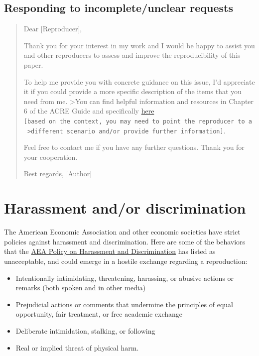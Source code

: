 \documentclass[]{book}
\providecommand{\tightlist}{%
  \setlength{\itemsep}{0pt}\setlength{\parskip}{0pt}}
\begin{document}
\hypertarget{responding-to-incompleteunclear-requests}{%
\subsection{Responding to incomplete/unclear requests}\label{responding-to-incompleteunclear-requests}}

\begin{quote}
Dear {[}Reproducer{]},

Thank you for your interest in my work and I would be happy to assist you and other reproducers to assess and improve the reproducibility of this paper.

To help me provide you with concrete guidance on this issue, I'd appreciate it if you could provide a more specific description of the items that you need from me. \textgreater{}You can find helpful information and resources in Chapter 6 of the ACRE Guide and specifically \href{https://bitss.github.io/ACRE/guidance-for-a-constructive-exchange-between-reproducers-and-original-authors.html\#asking-for-additional-guidance-when-some-materials-have-been-shared}{here} \texttt{{[}based\ on\ the\ context,\ you\ may\ need\ to\ point\ the\ reproducer\ to\ a\ \textgreater{}different\ scenario\ and/or\ provide\ further\ information{]}}.

Feel free to contact me if you have any further questions. Thank you for your cooperation.

Best regards,
{[}Author{]}
\end{quote}

\hypertarget{harassment-andor-discrimination}{%
\section{Harassment and/or discrimination}\label{harassment-andor-discrimination}}

The American Economic Association and other economic societies have strict policies against harassment and discrimination. Here are some of the behaviors that the \href{https://www.aeaweb.org/about-aea/aea-policy-harassment-discrimination}{AEA Policy on Harassment and Discrimination} has listed as unacceptable, and could emerge in a hostile exchange regarding a reproduction:

\begin{itemize}
\tightlist
\item
  Intentionally intimidating, threatening, harassing, or abusive actions or remarks (both spoken and in other media)
\item
  Prejudicial actions or comments that undermine the principles of equal opportunity, fair treatment, or free academic exchange
\item
  Deliberate intimidation, stalking, or following
\item
  Real or implied threat of physical harm.
\end{itemize}
\end{document}
